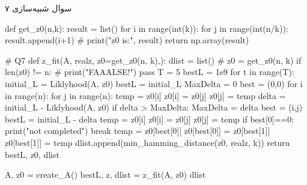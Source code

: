 سوال شبیه‌سازی ۷

\begin{latin}
\begin{python}
def get_z0(n,k):
    result = list()
    for i in range(int(k)):
        for j in range(int(n/k)):
            result.append(i+1)
    # print("z0 is:", result)
    return np.array(result)

# Q7
def z_fit(A, realz, z0=get_z0(n, k),):
    dlist = list()
    # z0 = get_z0(n, k)
    if len(z0) != n:
        # print("FAAALSE!")
        pass
    T = 5
    bestL = 1e9
    for t in range(T):
        initial_L = Liklyhood(A, z0)
        bestL = initial_L
        MaxDelta = 0
        best = (0,0)
        for i in range(n):
            for j in range(n):
                temp = z0[i]
                z0[i] = z0[j]
                z0[j] = temp
                delta = initial_L - Liklyhood(A, z0)
                if delta > MaxDelta:
                    MaxDelta = delta
                    best = (i,j)
                    bestL = initial_L - delta
                temp = z0[i]
                z0[i] = z0[j]
                z0[j] = temp
        if best[0]==0:
            print("not completed")
            break
        temp = z0[best[0]]
        z0[best[0]] = z0[best[1]]
        z0[best[1]] = temp
        dlist.append(min_hamming_distance(z0, realz, k))
    return bestL, z0, dlist

A, z0 = create_A()
bestL, z, dlist = z_fit(A, z0)
dlist
\end{python}
\end{latin}